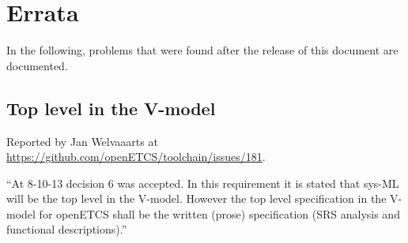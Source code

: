 
\chapter{Errata}

In the following, problems that were found after the release of this document are documented.

\section{Top level in the V-model}

Reported by Jan Welvaaarts at \url{https://github.com/openETCS/toolchain/issues/181}.

``At 8-10-13 decision 6 was accepted. In this requirement it is stated that sys-ML will be the top level in the V-model.
However the top level specification in the V-model for openETCS shall be the written (prose) specification (SRS analysis and functional descriptions).''

